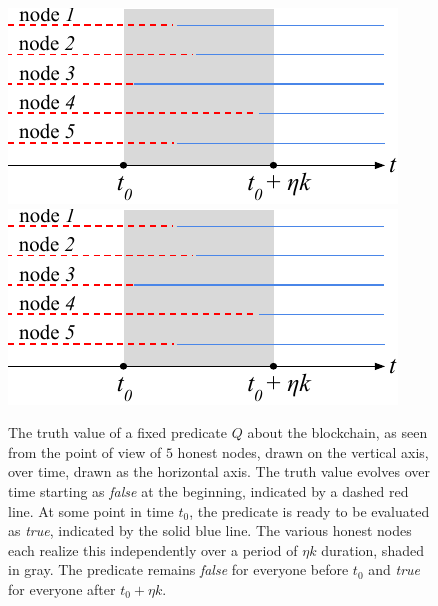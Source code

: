 \begin{figure}
    \caption{The truth value of a fixed predicate $Q$ about the blockchain, as
             seen from the point of view of $5$ honest nodes, drawn on the
             vertical axis, over time, drawn as the horizontal axis. The truth
             value evolves over time starting as \emph{false} at the beginning,
             indicated by a dashed red line. At some point in time $t_0$, the
             predicate is ready to be evaluated as \emph{true}, indicated by the
             solid blue line. The various honest nodes each realize this
             independently over a period of $\eta k$ duration, shaded in gray.
             The predicate remains \emph{false} for everyone before $t_0$ and
             \emph{true} for everyone after $t_0 + \eta k$.}
    \centering
    \iftwocolumn
        \includegraphics[width=\columnwidth,keepaspectratio]{figures/predicate-evolution.pdf}
    \else
        \includegraphics[width=0.4\columnwidth,keepaspectratio]{figures/predicate-evolution.pdf}
    \fi
    \label{fig.evolution}
\end{figure}

